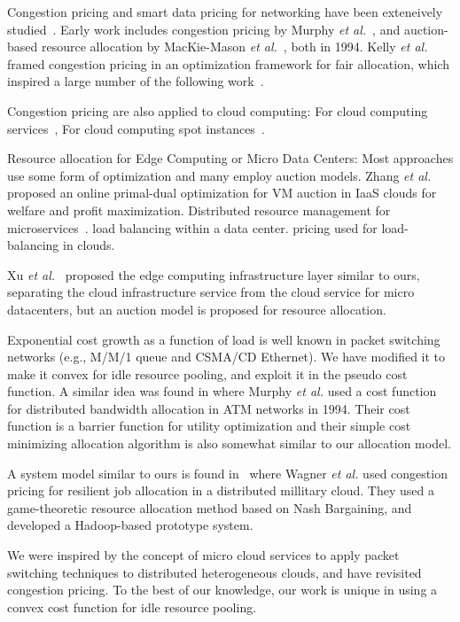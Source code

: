Congestion pricing and smart data pricing for networking have been
exteneively studied~\cite{Sen-2013}.
Early work includes congestion pricing by
Murphy {\em et al.}~\cite{Murphy94distributedpricing},
and auction-based resource allocation by
MacKie-Mason {\em et al.}~\cite{pricing-internet-1994}, both in 1994.
Kelly {\em et al.}~\cite{Kelly-1998} framed congestion pricing in an
optimization framework for fair allocation, which inspired a large
number of the following
work~\cite{gibbens1999resource,Henderson2001,Briscoe2003-M3I}.

Congestion pricing are also applied to cloud computing:
For cloud computing services~\cite{Wang-hotcloud2010,Kilcioglu-SIGMETRICS2015},
For cloud computing spot instances~\cite{Song-INFOCOM2017}.

Resource allocation for Edge Computing or Micro Data Centers:
Most approaches use some form of optimization and many employ auction
models.
Zhang {\em et al.}~\cite{Xu2017-zenith,Zhang2017-VMauction}
proposed an online primal-dual optimization for VM auction in IaaS
clouds for welfare and profit maximization.
Distributed resource management for microservices~\cite{Suresh-SOA-SOCC2017}.
load balancing within a data center\cite{Rikhtegar2021BiTEAD}.
pricing used for load-balancing in clouds\cite{Song-2014,Ren-2017}.

Xu {\em et al.}~\cite{Xu2017-zenith} proposed the edge computing
infrastructure layer similar to ours, separating the cloud
infrastructure service from the cloud service for micro datacenters,
but an auction model is proposed for resource allocation.

Exponential cost growth as a function of load is well known in packet
switching networks (e.g., M/M/1 queue and CSMA/CD Ethernet).
We have modified it to make it convex for idle resource pooling, and
exploit it in the pseudo cost function.
A similar idea was found in \cite{Murphy94distributedpricing} where
Murphy {\em et al.} used a cost function for distributed bandwidth
allocation in ATM networks in 1994.
Their cost function is a barrier function for utility optimization
and their simple cost minimizing allocation algorithm is also somewhat
similar to our allocation model.

A system model similar to ours is found in~\cite{Wagner-2012} where
Wagner {\em et al.} used congestion pricing for resilient job
allocation in a distributed millitary cloud.  They used a
game-theoretic resource allocation method based on Nash Bargaining,
and developed a Hadoop-based prototype system.

We were inspired by the concept of micro cloud services to apply packet
switching techniques to distributed heterogeneous clouds, and have
revisited congestion pricing.
To the best of our knowledge, our work is unique in using a convex
cost function for idle resource pooling.



